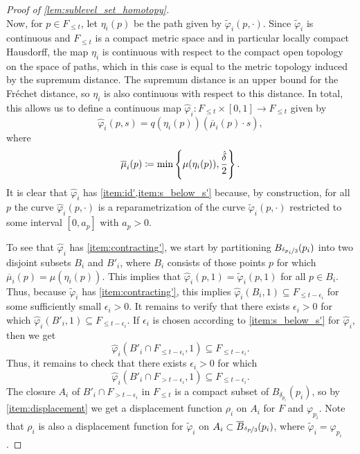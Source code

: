 \begin{proof}[Proof of \cref{lem:sublevel_set_homotopy}]
\begin{equation}
	\end{equation}
	Now, for $p \in F_{\leq t}$, let $\eta_{i}(p)$ be the path given by $\tilde{\varphi}_{i}(p,\cdot)$. 
	Since $\tilde{\varphi}_{i}$ is continuous and $F_{\leq t}$ is a compact metric space and in particular locally compact Hausdorff, the map $\eta_{i}$ is continuous with respect to the compact open topology on the space of paths, which in this case is equal to the metric topology induced by the supremum distance.
	The supremum distance is an upper bound for the Fr\'echet distance, so $\eta_{i}$ is also continuous with respect to this distance.
	In total, this allows us to define a continuous map $\hat{\varphi}_{i} \colon F_{\leq t} \times [0,1] \to F_{\leq t}$ given by 
	\[
	\hat{\varphi}_{i}(p,s) = q(\eta_{i}(p))(\overline{\mu}_{i}(p)\cdot s),
	\] 
	where 
	\[
	\overline{\mu}_{i}(p) \coloneqq \min \left\{ \mu(\eta_{i}(p)), \frac{\hat{\delta}}{2} \right\}.
	\]
	It is clear that $\hat{\varphi}_{i}$ has \cref{item:id',item:s_below_s'} because, by construction, for all $p$ the curve $\hat{\varphi}_{i}(p,\cdot)$ is a reparametrization of the  curve $\tilde{\varphi}_{i}(p,\cdot)$ restricted to some interval $[0,a_p]$ with $a_p >0$.
	
	To see that $\hat{\varphi}_{i}$ has \cref{item:contracting'}, we start by partitioning $B_{\nicefrac{\delta_{p_{i}}}{3}}(p_{i})$ into two disjoint subsets $B_{i}$ and $B'_{i}$,
	 where $B_{i}$ consists of those points $p$ for which $\overline{\mu}_{i}(p) = \mu(\eta_{i}(p))$.
	 This implies that $\hat{\varphi}_{i}(p,1) = \tilde{\varphi}_{i}(p,1)$ for all $p \in B_{i}$.
	Thus, because $\tilde{\varphi}_{i}$ has \cref{item:contracting'}, this implies 
	$\hat{\varphi}_{i}(B_{i}, 1) \subseteq F_{\leq t - \epsilon_i}$ for some sufficiently small $\epsilon_i > 0$.
	It remains to verify that there exists $\epsilon_{i} > 0$ for which $\hat{\varphi}_{i}(B'_{i},1) \subseteq F_{\leq t-\epsilon_{i}}$.
%	
%	
%	
	If $\epsilon_{i}$ is chosen according to \cref{item:s_below_s'} for $\hat{\varphi}_{i}$, then we get \[\hat{\varphi}_{i}(B'_{i} \cap F_{\leq t-\epsilon_{i}},1) \subseteq F_{\leq t-\epsilon_{i}}.\]
	Thus, it remains to check that there exists $\epsilon_{i} > 0$ for which \[\hat{\varphi}_{i}(B'_{i} \cap F_{> t-\epsilon_{i}},1) \subseteq F_{\leq t-\epsilon_{i}}.\]
	The closure $A_{i}$ of $B'_{i} \cap F_{> t-\epsilon_{i}}$ in $F_{\leq t}$ is a compact subset of $B_{\delta_{p_{i}}}(p_{i})$, so by \cref{item:displacement} we get a displacement function $\rho_{i}$ on $A_{i}$ for $F$ and $\varphi_{p_{i}}$.
	Note that $\rho_{i}$ is also a displacement function for $\tilde{\varphi}_{i}$ on $A_{i} \subset \overline{B}_{\nicefrac{\delta_{p}}{3}}(p_i)$, where $\tilde{\varphi}_{i} = \varphi_{p_{i}}$.
	

\end{proof}
